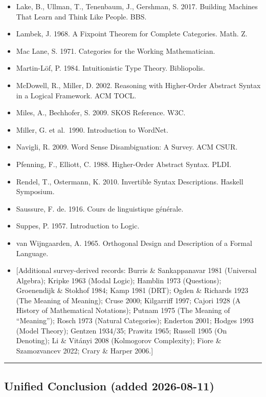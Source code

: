 \documentclass[
]{article}
\begin{document}
\begin{itemize}
\item
  Lake, B., Ullman, T., Tenenbaum, J., Gershman, S. 2017. Building
  Machines That Learn and Think Like People. BBS.
\item
  Lambek, J. 1968. A Fixpoint Theorem for Complete Categories. Math. Z.
\item
  Mac Lane, S. 1971. Categories for the Working Mathematician.
\item
  Martin-Löf, P. 1984. Intuitionistic Type Theory. Bibliopolis.
\item
  McDowell, R., Miller, D. 2002. Reasoning with Higher-Order Abstract
  Syntax in a Logical Framework. ACM TOCL.
\item
  Miles, A., Bechhofer, S. 2009. SKOS Reference. W3C.
\item
  Miller, G. et al.~1990. Introduction to WordNet.
\item
  Navigli, R. 2009. Word Sense Disambiguation: A Survey. ACM CSUR.
\item
  Pfenning, F., Elliott, C. 1988. Higher-Order Abstract Syntax. PLDI.
\item
  Rendel, T., Ostermann, K. 2010. Invertible Syntax Descriptions.
  Haskell Symposium.
\item
  Saussure, F. de. 1916. Cours de linguistique générale.
\item
  Suppes, P. 1957. Introduction to Logic.
\item
  van Wijngaarden, A. 1965. Orthogonal Design and Description of a
  Formal Language.
\item
  {[}Additional survey-derived records: Burris \& Sankappanavar 1981
  (Universal Algebra); Kripke 1963 (Modal Logic); Hamblin 1973
  (Questions); Groenendijk \& Stokhof 1984; Kamp 1981 (DRT); Ogden \&
  Richards 1923 (The Meaning of Meaning); Cruse 2000; Kilgarriff 1997;
  Cajori 1928 (A History of Mathematical Notations); Putnam 1975 (The
  Meaning of ``Meaning''); Rosch 1973 (Natural Categories); Enderton
  2001; Hodges 1993 (Model Theory); Gentzen 1934/35; Prawitz 1965;
  Russell 1905 (On Denoting); Li \& Vitányi 2008 (Kolmogorov
  Complexity); Fiore \& Szamozvancev 2022; Crary \& Harper 2006.{]}
\end{itemize}

\begin{center}\rule{0.5\linewidth}{0.5pt}\end{center}

\subsection{Unified Conclusion (added
2026-08-11)}\label{unified-conclusion-added-2026-08-11}
\end{document}
